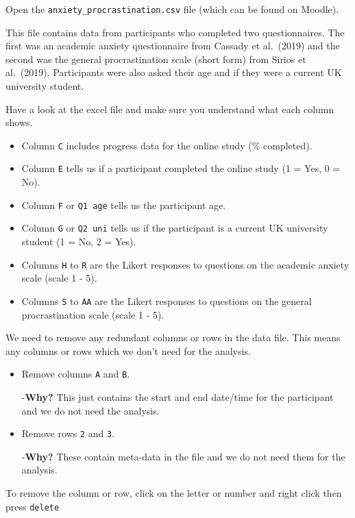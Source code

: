 \documentclass[
]{book}
\providecommand{\tightlist}{%
  \setlength{\itemsep}{0pt}\setlength{\parskip}{0pt}}
\begin{document}
Open the \texttt{anxiety\_procrastination.csv} file (which can be found on Moodle).

This file contains data from participants who completed two questionnaires.
The first was an academic anxiety questionnaire from Cassady et al.~(2019) and the second was the general procrastination scale (short form) from Sirios et al.~(2019).
Participants were also asked their age and if they were a current UK university student.

Have a look at the excel file and make sure you understand what each column shows.

\begin{itemize}
\tightlist
\item
  Column \texttt{C} includes progress data for the online study (\% completed).
\item
  Column \texttt{E} tells us if a participant completed the online study (1 = Yes, 0 = No).
\item
  Column \texttt{F} or \texttt{Q1\ age} tells us the participant age.
\item
  Column \texttt{G} or \texttt{Q2\ uni} tells us if the participant is a current UK university student (1 = No, 2 = Yes).
\item
  Columns \texttt{H} to \texttt{R} are the Likert responses to questions on the academic anxiety scale (scale 1 - 5).
\item
  Columns \texttt{S} to \texttt{AA} are the Likert responses to questions on the general procrastination scale (scale 1 - 5).
\end{itemize}

We need to remove any redundant columns or rows in the data file.
This means any columns or rows which we don't need for the analysis.

\begin{itemize}
\item
  Remove columns \texttt{A} and \texttt{B}.

  -\textbf{Why?} This just contains the start and end date/time for the participant and we do not need the analysis.
\item
  Remove rows \texttt{2} and \texttt{3}.

  -\textbf{Why?} These contain meta-data in the file and we do not need them for the analysis.
\end{itemize}

To remove the column or row, click on the letter or number and right click then press \texttt{delete}
\end{document}
